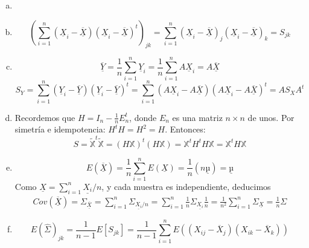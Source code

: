 \documentclass[twoside]{article}
\newcommand{\media}[1]{{\overline{#1}}}
\newcommand{\muestra}[1]{{\underline{#1}}}
\newcommand{\m}[1]{{\muestra{#1}}}
\newcommand{\mX}{{\muestra{X}}}
\begin{document}
\begin{solucion}
\begin{enumerate}[(a)]
\item[]
\item
\[ \left(\sum_{i=1}^n (\mX_i-\media{\m{X}})(\mX_i-\media{\m{X}})^t\right)_{jk} = \sum_{i=1}^n (\mX_i-\media{\m{X}})_j(\mX_i-\media{\m{X}})_k = S_{jk} \]
\item
\[ \media{\m{Y}} = \frac{1}{n} \sum_{i=1}^n \m{Y}_i = \frac{1}{n} \sum_{i=1}^n A\m{X}_i = A \media{\mX} \]
\[ S_Y = \sum_{i=1}^n (\m{Y}_i-\media{\m{Y}})(\m{Y}_i-\media{\m{Y}})^t = \sum_{i=1}^n (A\mX_i-A\media{\mX})(A\mX_i-A\media{\mX})^t = A S_X A^t\]
\item Recordemos que $H = I_n - \frac{1}{n}E_n^t$, donde $E_n$ es una matriz $n \times n$ de unos. 
Por simetría e idempotencia: $H^t H = H^2 = H$. Entonces:
\[ S = \tilde{\mathbb{X}}^t\tilde{\mathbb{X}} = (H \mathbb{X})^t (H \mathbb{X}) = \mathbb{X}^t H^t H \mathbb{X} = \mathbb{X}^t H \mathbb{X} \]
\item
\[ E(\media{\mX}) = \frac{1}{n}\sum_{i=1}^n E(\mX) = \frac{1}{n} (n \m{µ}) = \m{µ} \]
Como $\mX= \sum_{i=1}^n \muestra{X_i}/n$, y cada muestra es independiente, deducimos 
\begin{gather*}
 Cov(\media{\mX}) = \Sigma_{\media{\mX}}=\sum_{i=1}^n\Sigma_{\muestra{X_i}/n} = \sum_{i=1}^n\frac{1}{n} \Sigma_{\muestra{X_i}} \frac{1}{n} = \frac{1}{n^2}\sum_{i=1}^n \Sigma_{\muestra{X}}= \frac{1}{n}\Sigma
\end{gather*}
\item
\[ E(\hat{Σ})_{jk} = \frac{1}{n-1} E[S_{jk}] = \frac{1}{n-1} \sum_{i=1}^n E\left((X_{ij}-\media{X}_j)(X_{ik}-\media{X}_k)\right)\]
\end{enumerate}

\end{solucion}

\newpage
\end{document}
